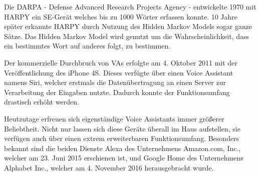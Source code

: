 Die DARPA - Defense Advanced Research Projects Agency - entwickelte 1970 mit HARPY ein SE-Gerät welches bis zu 1000 Wörter erfassen konnte. 10 Jahre später erkannte HARPY durch Nutzung des Hidden Markov Models sogar ganze Sätze. Das Hidden Markov Model wird genutzt um die Wahrscheinlichkeit, dass ein bestimmtes Wort auf anderes folgt, zu bestimmen.

Der kommerzielle Durchbruch von VAs erfolgte am 4. Oktober 2011 mit der Veröffentlichung des iPhone 4S. Dieses verfügte über einen Voice Assistant namens Siri, welcher erstmals die Datenübertragung an einen Server zur Verarbeitung der Eingaben nutzte. Dadurch konnte der Funktionsumfang drastisch erhöht werden.

Heutzutage erfreuen sich eigenständige Voice Assistants immer größerer Beliebtheit. Nicht nur lassen sich diese Geräte überall im Haus aufstellen, sie verfügen auch über einen extrem erweiterbaren Funktionsumfang. Besonders bekannt sind die beiden Dienste Alexa des Unternehmens Amazon.com, Inc., welcher am 23. Juni 2015 erschienen ist, und Google Home des Unternehmens Alphabet Inc., welcher am 4. November 2016 herausgebracht wurde.
\newpage